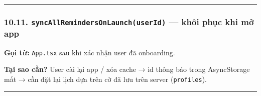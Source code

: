 \documentclass[12pt,a4paper]{article}
\begin{document}
\begin{center}\rule{0.5\linewidth}{0.5pt}\end{center}

\subsubsection{\texorpdfstring{10.11.
\texttt{syncAllRemindersOnLaunch(userId)} --- khôi phục khi mở
app}{10.11. syncAllRemindersOnLaunch(userId) --- khôi phục khi mở app}}\label{syncallremindersonlaunchuserid-khuxf4i-phux1ee5c-khi-mux1edf-app}

\textbf{Gọi từ:} \texttt{App.tsx} sau khi xác nhận user đã onboarding.

\begin{Shaded}
\begin{Highlighting}[]
   \OperatorTok{:} \NormalTok{)}\OperatorTok{:} \OperatorTok{\textless{}}\OperatorTok{\textgreater{}}\NormalTok{ \{}
  \OperatorTok{;}

   \OperatorTok{;}   

  \OperatorTok{=}  \OperatorTok{;}
  \NormalTok{) \{}
    \OperatorTok{=}  \NormalTok{()}\OperatorTok{;}
     \NormalTok{)}\OperatorTok{;}
\NormalTok{  \}}
\NormalTok{\}}
\end{Highlighting}
\end{Shaded}

\textbf{Tại sao cần?} User cài lại app / xóa cache → id thông báo trong
AsyncStorage mất → cần đặt lại lịch dựa trên cờ đã lưu trên server
(\texttt{profiles}).

\begin{center}\rule{0.5\linewidth}{0.5pt}\end{center}
\end{document}
